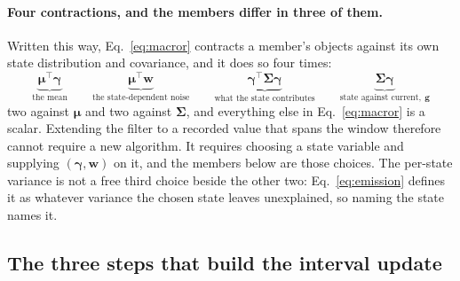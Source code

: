 \begin{appendixbox}
\paragraph{Four contractions, and the members differ in three of them.}
Written this way, Eq.~\ref{eq:macror} contracts a member's objects against its own state
distribution and covariance, and it does so four times:
\[
  \underbrace{\bm{\mu}^\top\bm{\gamma}}_{\text{the mean}}
  \qquad
  \underbrace{\bm{\mu}^\top\mathbf{w}}_{\text{the state-dependent noise}}
  \qquad
  \underbrace{\bm{\gamma}^\top\bm{\Sigma}\bm{\gamma}}_{\text{what the state contributes}}
  \qquad
  \underbrace{\bm{\Sigma}\bm{\gamma}}_{\text{state against current},\ \mathbf{g}}
\]
two against $\bm{\mu}$ and two against $\bm{\Sigma}$, and everything else in Eq.~\ref{eq:macror} is
a scalar. Extending the filter to a recorded value that spans the window therefore cannot require a
new algorithm. It requires choosing a state variable and supplying $(\bm{\gamma},\mathbf{w})$ on
it, and the members below are those choices. The per-state variance is not a free third choice
beside the other two: Eq.~\ref{eq:emission} defines it as whatever variance the chosen state leaves
unexplained, so naming the state names it.

\subsection*{The three steps that build the interval update}


\end{appendixbox}
